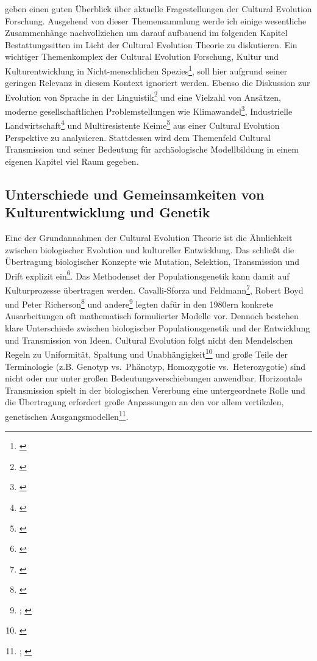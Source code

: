 \documentclass[openany,twoside,twocolumn]{book}
\let\rmarkdownfootnote\footnote%
\def\footnote{\protect\rmarkdownfootnote}
\begin{document}
\textcite{creanza_cultural_2017} geben einen guten Überblick über
aktuelle Fragestellungen der Cultural Evolution Forschung. Ausgehend von
dieser Themensammlung werde ich einige wesentliche Zusammenhänge
nachvollziehen um darauf aufbauend im folgenden Kapitel
Bestattungssitten im Licht der Cultural Evolution Theorie zu
diskutieren. Ein wichtiger Themenkomplex der Cultural Evolution
Forschung, Kultur und Kulturentwicklung in Nicht-menschlichen
Spezies\footnote{\textcite{laland_question_2009}}, soll hier aufgrund
seiner geringen Relevanz in diesem Kontext ignoriert werden. Ebenso die
Diskussion zur Evolution von Sprache in der Linguistik\footnote{\textcite{nowak_evolution_1999}}
und eine Vielzahl von Ansätzen, moderne gesellschaftlichen
Problemstellungen wie Klimawandel\footnote{\textcite{seneviratne_allowable_2016}},
Industrielle Landwirtschaft\footnote{\textcite{garibaldi_farming_2017}}
und Multiresistente Keime\footnote{\textcite{boni_evolution_2005}} aus
einer Cultural Evolution Perspektive zu analysieren. Stattdessen wird
dem Themenfeld Cultural Transmission und seiner Bedeutung für
archäologische Modellbildung in einem eigenen Kapitel viel Raum gegeben.

\hypertarget{unterschiede-und-gemeinsamkeiten-von-kulturentwicklung-und-genetik}{%
\subsection{Unterschiede und Gemeinsamkeiten von Kulturentwicklung und
Genetik}\label{unterschiede-und-gemeinsamkeiten-von-kulturentwicklung-und-genetik}}

Eine der Grundannahmen der Cultural Evolution Theorie ist die
Ähnlichkeit zwischen biologischer Evolution und kultureller Entwicklung.
Das schließt die Übertragung biologischer Konzepte wie Mutation,
Selektion, Transmission und Drift explizit ein\footnote{\textcite{smith_cultural_1992}}.
Das Methodenset der Populationsgenetik kann damit auf Kulturprozesse
übertragen werden. Cavalli-Sforza und Feldmann\footnote{\textcite{cavalli-sforza_cultural_1981}},
Robert Boyd und Peter Richerson\footnote{\textcite{boyd_culture_1985}}
und andere\footnote{\textcite{lumsden_genes_1981};
  \textcite{pulliam_programmed_1980}} legten dafür in den 1980ern
konkrete Ausarbeitungen oft mathematisch formulierter Modelle vor.
Dennoch bestehen klare Unterschiede zwischen biologischer
Populationsgenetik und der Entwicklung und Transmission von Ideen.
Cultural Evolution folgt nicht den Mendelschen Regeln zu Uniformität,
Spaltung und Unabhängigkeit\footnote{\textcite{mesoudi_pursuing_2017}}
und große Teile der Terminologie (z.B. Genotyp vs.~Phänotyp, Homozygotie
vs.~Heterozygotie) sind nicht oder nur unter großen
Bedeutungsverschiebungen anwendbar. Horizontale Transmission spielt in
der biologischen Vererbung eine untergeordnete Rolle und die Übertragung
erfordert große Anpassungen an den vor allem vertikalen, genetischen
Ausgangsmodellen\footnote{\textcite{cavalli-sforza_cultural_1973};
  \textcite{feldman_cultural_1976}}.
\end{document}
